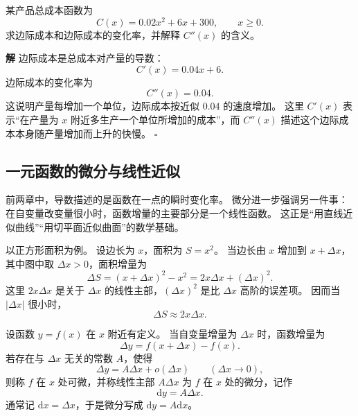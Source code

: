 \documentclass[fontset=fandol]{ctexart}
\newenvironment{solution}{\par\noindent\textbf{解}\quad}{\hfill$\square$\par\vspace{0.8em}}
\newcommand{\dd}{\mathrm{d}}
\begin{document}
\begin{example}[边际成本变化率]
某产品总成本函数为
\[
C(x)=0.02x^2+6x+300,\qquad x\geq0.
\]
求边际成本和边际成本的变化率，并解释 $C''(x)$ 的含义。
\end{example}
\begin{solution}
边际成本是总成本对产量的导数：
\[
C'(x)=0.04x+6.
\]
边际成本的变化率为
\[
C''(x)=0.04.
\]
这说明产量每增加一个单位，边际成本按近似 $0.04$ 的速度增加。 这里 $C'(x)$ 表示“在产量为 $x$ 附近多生产一个单位所增加的成本”，而 $C''(x)$ 描述这个边际成本本身随产量增加而上升的快慢。
\end{solution}

\subsection{一元函数的微分与线性近似}

前两章中，导数描述的是函数在一点的瞬时变化率。 微分进一步强调另一件事：在自变量改变量很小时，函数增量的主要部分是一个线性函数。 这正是“用直线近似曲线”“用切平面近似曲面”的数学基础。

以正方形面积为例。 设边长为 $x$，面积为 $S=x^2$。 当边长由 $x$ 增加到 $x+\Delta x$，其中图中取 $\Delta x>0$，面积增量为
\[
\Delta S=(x+\Delta x)^2-x^2=2x\Delta x+(\Delta x)^2.
\]
这里 $2x\Delta x$ 是关于 $\Delta x$ 的线性主部，$(\Delta x)^2$ 是比 $\Delta x$ 高阶的误差项。 因而当 $|\Delta x|$ 很小时，
\[
\Delta S\approx 2x\Delta x.
\]

\begin{center}
\end{center}

\begin{definition}[一元函数可微与微分]
设函数 $y=f(x)$ 在 $x$ 附近有定义。 当自变量增量为 $\Delta x$ 时，函数增量为
\[
\Delta y=f(x+\Delta x)-f(x).
\]
若存在与 $\Delta x$ 无关的常数 $A$，使得
\[
\Delta y=A\Delta x+o(\Delta x)\qquad(\Delta x\to0),
\]
则称 $f$ 在 $x$ 处可微，并称线性主部 $A\Delta x$ 为 $f$ 在 $x$ 处的微分，记作
\[
\dd y=A\Delta x.
\]
通常记 $\dd x=\Delta x$，于是微分写成 $\dd y=A\dd x$。
\end{definition}
\end{document}
